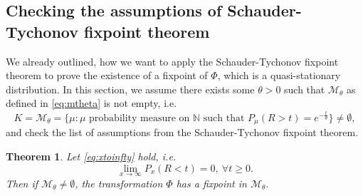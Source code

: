 \documentclass[12pt,a4paper]{scrartcl}
\newtheorem{theorem}{Theorem}[section]
\numberwithin{equation}{section}
\newcommand{\N}{\mathbb{N}} %
\begin{document}
\subsection{Checking the assumptions of Schauder-Tychonov fixpoint theorem} \label{subsectiontychonov}

We already outlined, how we want to apply the Schauder-Tychonov fixpoint theorem to prove the existence of a fixpoint of $\Phi$, which is a quasi-stationary distribution. In this section, we assume there exists some $\theta > 0$ such that $\mathcal{M}_\theta$ as defined in \eqref{eq:mtheta} is not empty, i.e.
$$K = \mathcal{M}_{\theta} = \lbrace  \mu : \mu \text{ probability measure on } \N \text{ such that } P_{\mu}\left(R>t\right) = e^{-\frac{t}{\theta}}\rbrace \neq \emptyset,$$
and check the list of assumptions from the Schauder-Tychonov fixpoint theorem.

\begin{theorem} \label{th:mthetacontainsfixpoint} Let \eqref{eq:xtoinfty} hold, i.e.
\begin{equation*}
\lim_{ x \to \infty} {P_{x}\left(R < t\right)} = 0 , \ \forall t \geq 0.
\end{equation*}
Then if $\mathcal{M}_{\theta} \neq \emptyset$, the transformation $\Phi$ has a fixpoint in $\mathcal{M}_{\theta}.$
\end{theorem}
\end{document}
